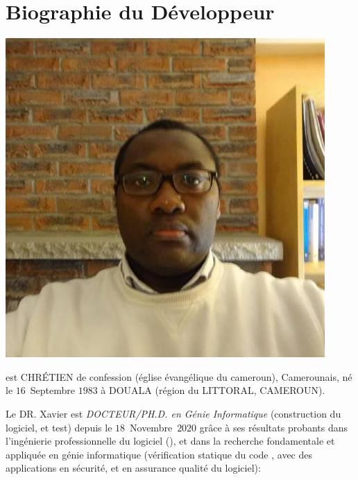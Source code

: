 \section{Biographie du Développeur}\label{chap:biographie}
\vspace{-0.9em}

\begin{center}
\includegraphics[scale=0.32]{../../francais/images/XavierNOUNDOU-2}
\end{center}

\textbf{\myfullacademicname} est CHRÉTIEN de confession
(église évangélique du cameroun),
Camerounais, né le $16$~Septembre $1983$ à
DOUALA (région du LITTORAL, CAMEROUN).

Le DR. Xavier est \textit{DOCTEUR/PH.D. en Génie Informatique}
(construction du logiciel, et test) depuis le $18$~Novembre~$2020$
grâce à ses résultats probants dans l'ingénierie
professionnelle du logiciel (\yerotherpblack), et dans la recherche
fondamentale et appliquée en génie informatique
(vérification statique du code \cplusplus, avec des applications
en sécurité, et en assurance qualité du logiciel):

